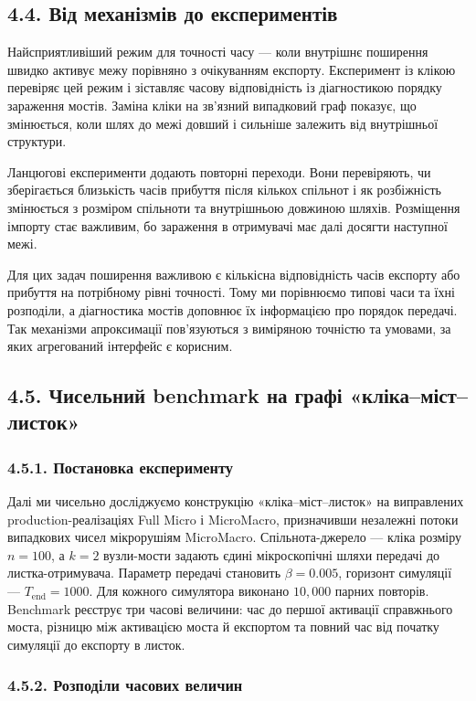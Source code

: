 \documentclass[10pt]{article}
\begin{document}
{\subsection*{4.4. Від механізмів до експериментів}
Найсприятливіший режим для точності часу — коли внутрішнє поширення швидко активує межу порівняно з очікуванням експорту. Експеримент із клікою перевіряє цей режим і зіставляє часову відповідність із діагностикою порядку зараження мостів. Заміна кліки на зв’язний випадковий граф показує, що змінюється, коли шлях до межі довший і сильніше залежить від внутрішньої структури.

Ланцюгові експерименти додають повторні переходи. Вони перевіряють, чи зберігається близькість часів прибуття після кількох спільнот і як розбіжність змінюється з розміром спільноти та внутрішньою довжиною шляхів. Розміщення імпорту стає важливим, бо зараження в отримувачі має далі досягти наступної межі.

Для цих задач поширення важливою є кількісна відповідність часів експорту або прибуття на потрібному рівні точності. Тому ми порівнюємо типові часи та їхні розподіли, а діагностика мостів доповнює їх інформацією про порядок передачі. Так механізми апроксимації пов’язуються з виміряною точністю та умовами, за яких агрегований інтерфейс є корисним.

\subsection*{4.5. Чисельний benchmark на графі «кліка–міст–листок»}
\subsubsection*{4.5.1. Постановка експерименту}
Далі ми чисельно досліджуємо конструкцію «кліка–міст–листок» на виправлених production-реалізаціях Full Micro і MicroMacro, призначивши незалежні потоки випадкових чисел мікрорушіям MicroMacro. Спільнота-джерело — кліка розміру $n=100$, а $k=2$ вузли-мости задають єдині мікроскопічні шляхи передачі до листка-отримувача. Параметр передачі становить $\beta=0.005$, горизонт симуляції — $T_{\mathrm{end}}=1000$. Для кожного симулятора виконано $10{,}000$ парних повторів. Benchmark реєструє три часові величини: час до першої активації справжнього моста, різницю між активацією моста й експортом та повний час від початку симуляції до експорту в листок.

\subsubsection*{4.5.2. Розподіли часових величин}
}{
}
\end{document}
